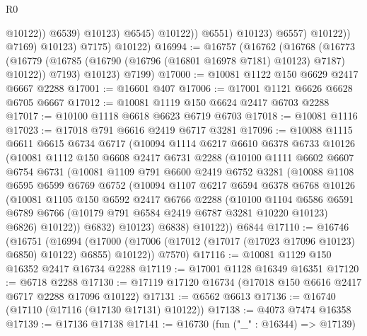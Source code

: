 \begin{lexlean}{R0}
\begin{coremodule}
                                    @10122))
                                @6539)
                              @10123)
                            @6545)
                          @10122))
                      @6551)
                    @10123)
                  @6557)
                @10122))
            @7169)
          @10123)
        @7175)
      @10122)
@16994 := @16757
    (@16762
      (@16768
        (@16773 (@16779 (@16785 (@16790 (@16796 (@16801 @16978 @7181) @10123) @7187) @10122)) @7193)
        @10123)
      @7199)
@17000 := @10081 @1122 @150 @6629 @2417 @6667 @2288
@17001 := @16601 @407
@17006 := @17001 @1121 @6626 @6628 @6705 @6667
@17012 := @10081 @1119 @150 @6624 @2417 @6703 @2288
@17017 := @10100 @1118 @6618 @6623 @6719 @6703
@17018 := @10081 @1116
@17023 := @17018 @791 @6616 @2419 @6717 @3281
@17096 := @10088
    @1115
    @6611
    @6615
    @6734
    @6717
    (@10094
      @1114
      @6217
      @6610
      @6378
      @6733
      @10126
      (@10081
        @1112
        @150
        @6608
        @2417
        @6731
        @2288
        (@10100
          @1111
          @6602
          @6607
          @6754
          @6731
          (@10081
            @1109
            @791
            @6600
            @2419
            @6752
            @3281
            (@10088
              @1108
              @6595
              @6599
              @6769
              @6752
              (@10094
                @1107
                @6217
                @6594
                @6378
                @6768
                @10126
                (@10081
                  @1105
                  @150
                  @6592
                  @2417
                  @6766
                  @2288
                  (@10100
                    @1104
                    @6586
                    @6591
                    @6789
                    @6766
                    (@10179 @791 @6584 @2419 @6787 @3281 @10220 @10123)
                    @6826)
                  @10122))
              @6832)
            @10123)
          @6838)
        @10122))
    @6844
@17110 := @16746
    (@16751
      (@16994 (@17000 (@17006 (@17012 (@17017 (@17023 @17096 @10123) @6850) @10122) @6855) @10122))
      @7570)
@17116 := @10081 @1129 @150 @16352 @2417 @16734 @2288
@17119 := @17001 @1128 @16349 @16351
@17120 := @6718 @2288
@17130 := @17119 @17120 @16734 (@17018 @150 @6616 @2417 @6717 @2288 @17096 @10122)
@17131 := @6562 @6613
@17136 := @16740 (@17110 (@17116 (@17130 @17131) @10122))
@17138 := @4073 @7474 @16358
@17139 := @17136 @17138
@17141 := @16730 (fun ("_" : @16344) => @17139)

\end{coremodule}
\end{lexlean}
